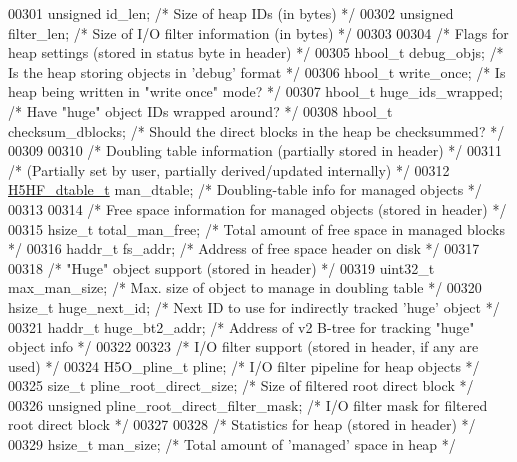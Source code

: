 \begin{DoxyCode}
00301     \textcolor{keywordtype}{unsigned}    id\_len;         \textcolor{comment}{/* Size of heap IDs (in bytes) */}
00302     \textcolor{keywordtype}{unsigned}    filter\_len;     \textcolor{comment}{/* Size of I/O filter information (in bytes) */}
00303 
00304     \textcolor{comment}{/* Flags for heap settings (stored in status byte in header) */}
00305     hbool\_t     debug\_objs;     \textcolor{comment}{/* Is the heap storing objects in 'debug' format */}
00306     hbool\_t     write\_once;     \textcolor{comment}{/* Is heap being written in "write once" mode? */}
00307     hbool\_t     huge\_ids\_wrapped; \textcolor{comment}{/* Have "huge" object IDs wrapped around? */}
00308     hbool\_t     checksum\_dblocks; \textcolor{comment}{/* Should the direct blocks in the heap be checksummed? */}
00309 
00310     \textcolor{comment}{/* Doubling table information (partially stored in header) */}
00311     \textcolor{comment}{/* (Partially set by user, partially derived/updated internally) */}
00312     \hyperlink{struct_h5_h_f__dtable__t}{H5HF\_dtable\_t} man\_dtable;   \textcolor{comment}{/* Doubling-table info for managed objects */}
00313 
00314     \textcolor{comment}{/* Free space information for managed objects (stored in header) */}
00315     hsize\_t     total\_man\_free; \textcolor{comment}{/* Total amount of free space in managed blocks */}
00316     haddr\_t     fs\_addr;        \textcolor{comment}{/* Address of free space header on disk */}
00317 
00318     \textcolor{comment}{/* "Huge" object support (stored in header) */}
00319     uint32\_t    max\_man\_size;   \textcolor{comment}{/* Max. size of object to manage in doubling table */}
00320     hsize\_t     huge\_next\_id;   \textcolor{comment}{/* Next ID to use for indirectly tracked 'huge' object */}
00321     haddr\_t     huge\_bt2\_addr;  \textcolor{comment}{/* Address of v2 B-tree for tracking "huge" object info */}
00322 
00323     \textcolor{comment}{/* I/O filter support (stored in header, if any are used) */}
00324     H5O\_pline\_t pline;          \textcolor{comment}{/* I/O filter pipeline for heap objects */}
00325     \textcolor{keywordtype}{size\_t}      pline\_root\_direct\_size;    \textcolor{comment}{/* Size of filtered root direct block */}
00326     \textcolor{keywordtype}{unsigned}    pline\_root\_direct\_filter\_mask; \textcolor{comment}{/* I/O filter mask for filtered root direct block */}
00327 
00328     \textcolor{comment}{/* Statistics for heap (stored in header) */}
00329     hsize\_t     man\_size;       \textcolor{comment}{/* Total amount of 'managed' space in heap */}

\end{DoxyCode}
